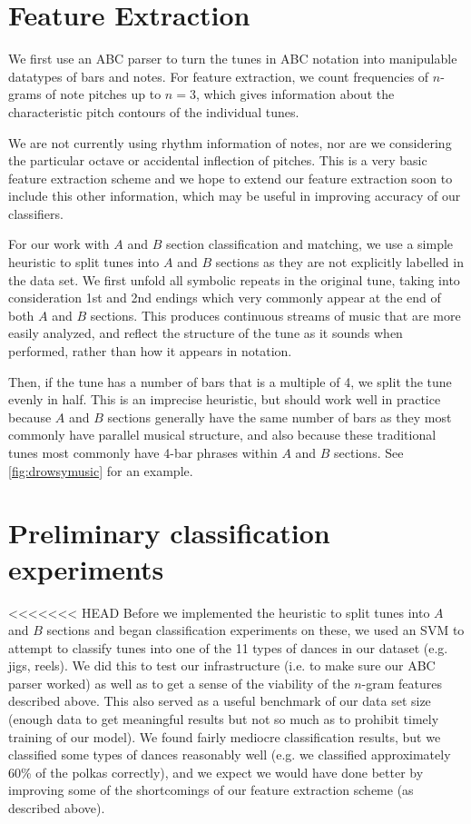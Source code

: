 \documentclass{article} %
\begin{document}
\section{Feature Extraction}

We first use an ABC parser to turn the tunes in ABC notation into manipulable
datatypes of bars and notes. For feature extraction, we count frequencies of
$n$-grams of note pitches up to $n=3$, which gives information about the
characteristic pitch contours of the individual tunes.

We are not currently using rhythm information of notes, nor are we considering
the particular octave or accidental inflection of pitches. This is a very basic
feature extraction scheme and we hope to extend our feature extraction soon to
include this other information, which may be useful in improving accuracy of our
classifiers.

For our work with $A$ and $B$ section classification and matching, we use a
simple heuristic to split tunes into $A$ and $B$ sections as they are not
explicitly labelled in the data set. We first unfold all symbolic repeats in the
original tune, taking into consideration 1st and 2nd endings which very commonly
appear at the end of both $A$ and $B$ sections. This produces continuous streams
of music that are more easily analyzed, and reflect the structure of the tune as
it sounds when performed, rather than how it appears in notation.

Then, if the tune has a number of bars that is a multiple of 4, we split the
tune evenly in half. This is an imprecise heuristic, but should work well in
practice because $A$ and $B$ sections generally have the same number of bars as
they most commonly have parallel musical structure, and also because these
traditional tunes most commonly have 4-bar phrases within $A$ and $B$ sections.
See \cref{fig:drowsymusic} for an example.

\section{Preliminary classification experiments}

<<<<<<< HEAD
Before we implemented the heuristic to split tunes into $A$ and $B$ sections
and began classification experiments on these, we used an SVM to attempt to 
classify tunes into one of the 11 types of dances in our dataset (e.g. jigs,
reels). We did this to test our infrastructure (i.e. to make sure our ABC 
parser worked) as well as to get a sense of the viability of the $n$-gram
features described above. This also served as a useful benchmark of our data set
size (enough data to get meaningful results but not so much as to prohibit
timely training of our model). We found fairly mediocre classification results,
but we classified some types of dances reasonably well (e.g. we classified 
approximately 60\% of the polkas correctly), and we expect we would have done
better by improving some of the shortcomings of our feature extraction scheme 
(as described above).
\end{document}
